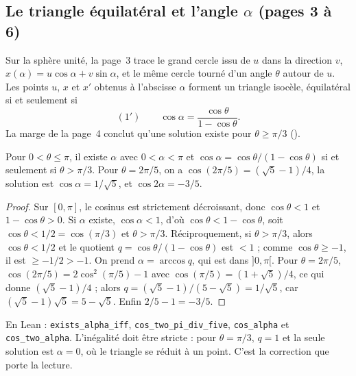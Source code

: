 \subsection*{Le triangle équilatéral et l'angle $\alpha$ (pages 3 à 6)}

Sur la sphère unité, la page~3 trace le grand cercle issu de $u$ dans la direction $v$, $x(\alpha) = u\cos\alpha + v\sin\alpha$, et le même cercle tourné d'un angle $\theta$ autour de $u$. Les points $u$, $x$ et $x'$ obtenus à l'abscisse $\alpha$ forment un triangle isocèle, équilatéral si et seulement si
\[
(1')\qquad \cos\alpha = \frac{\cos\theta}{1 - \cos\theta}.
\]
La marge de la page~4 conclut qu'une solution existe pour $\theta \geq \pi/3$ ().

\begin{enonce}
Pour $0 < \theta \leq \pi$, il existe $\alpha$ avec $0 < \alpha < \pi$ et $\cos\alpha = \cos\theta/(1 - \cos\theta)$ si et seulement si $\theta > \pi/3$. Pour $\theta = 2\pi/5$, on a $\cos(2\pi/5) = (\sqrt5 - 1)/4$, la solution est $\cos\alpha = 1/\sqrt5$, et $\cos 2\alpha = -3/5$.
\end{enonce}

\begin{proof}
Sur $[0, \pi]$, le cosinus est strictement décroissant, donc $\cos\theta < 1$ et $1 - \cos\theta > 0$. Si $\alpha$ existe, $\cos\alpha < 1$, d'où $\cos\theta < 1 - \cos\theta$, soit $\cos\theta < 1/2 = \cos(\pi/3)$ et $\theta > \pi/3$. Réciproquement, si $\theta > \pi/3$, alors $\cos\theta < 1/2$ et le quotient $q = \cos\theta/(1 - \cos\theta)$ est $< 1$ ; comme $\cos\theta \geq -1$, il est $\geq -1/2 > -1$. On prend $\alpha = \arccos q$, qui est dans $]0, \pi[$. Pour $\theta = 2\pi/5$, $\cos(2\pi/5) = 2\cos^2(\pi/5) - 1$ avec $\cos(\pi/5) = (1 + \sqrt5)/4$, ce qui donne $(\sqrt5 - 1)/4$ ; alors $q = (\sqrt5 - 1)/(5 - \sqrt5) = 1/\sqrt5$, car $(\sqrt5 - 1)\sqrt5 = 5 - \sqrt5$. Enfin $2/5 - 1 = -3/5$.
\end{proof}

\noindent En Lean : \texttt{exists\_alpha\_iff}, \texttt{cos\_two\_pi\_div\_five}, \texttt{cos\_alpha} et \texttt{cos\_two\_alpha}. L'inégalité doit être stricte : pour $\theta = \pi/3$, $q = 1$ et la seule solution est $\alpha = 0$, où le triangle se réduit à un point. C'est la correction que porte la lecture.

